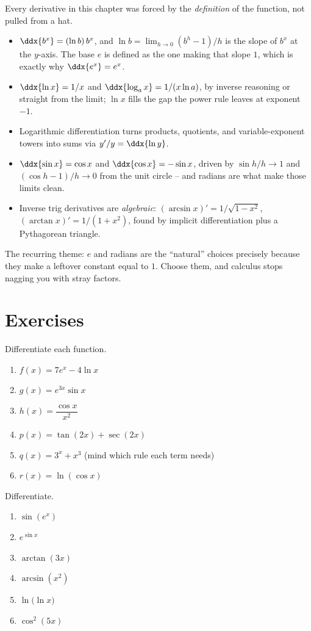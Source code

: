 Every derivative in this chapter was forced by the \emph{definition} of the
function, not pulled from a hat.
\begin{itemize}
\item $\ddx{b^x} = (\ln b)\,b^x$, and $\ln b = \lim_{h\to0}(b^h-1)/h$ is the
slope of $b^x$ at the $y$-axis. The base $e$ is defined as the one making
that slope $1$, which is exactly why $\ddx{e^x}=e^x$.
\item $\ddx{\ln x}=1/x$ and $\ddx{\log_a x} = 1/(x\ln a)$, by inverse
reasoning or straight from the limit; $\ln x$ fills the gap the power rule
leaves at exponent $-1$.
\item Logarithmic differentiation turns products, quotients, and
variable-exponent towers into sums via $y'/y = \ddx{\ln y}$.
\item $\ddx{\sin x}=\cos x$ and $\ddx{\cos x}=-\sin x$, driven by
$\sin h/h\to1$ and $(\cos h-1)/h\to 0$ from the unit circle -- and radians
are what make those limits clean.
\item Inverse trig derivatives are \emph{algebraic}:
$(\arcsin x)'=1/\sqrt{1-x^2}$, $(\arctan x)'=1/(1+x^2)$, found by implicit
differentiation plus a Pythagorean triangle.
\end{itemize}
The recurring theme: $e$ and radians are the ``natural'' choices precisely
because they make a leftover constant equal to $1$. Choose them, and
calculus stops nagging you with stray factors.

\section{Exercises}
\label{ch12:exercises}

\begin{exercise}
\label{ch12:exr-warmup}
Differentiate each function.
\begin{enumerate}[label=(\alph*)]
\item $f(x) = 7e^x - 4\ln x$
\item $g(x) = e^{3x}\sin x$
\item $h(x) = \dfrac{\cos x}{x^2}$
\item $p(x) = \tan(2x) + \sec(2x)$
\item $q(x) = 3^x + x^3$ (mind which rule each term needs)
\item $r(x) = \ln(\cos x)$
\end{enumerate}
\end{exercise}

\begin{exercise}
\label{ch12:exr-chain}
Differentiate.
\begin{enumerate}[label=(\alph*)]
\item $\sin(e^x)$
\item $e^{\sin x}$
\item $\arctan(3x)$
\item $\arcsin(x^2)$
\item $\ln\!\big(\ln x\big)$
\item $\cos^2(5x)$
\end{enumerate}
\end{exercise}

